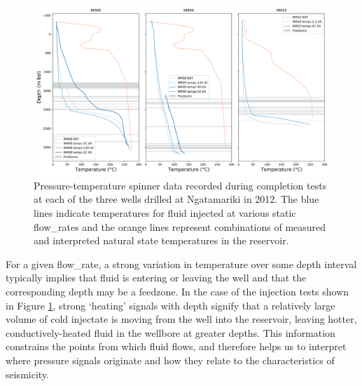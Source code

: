 \begin{figure}
\begin{center}
\includegraphics[width=\textwidth,height=\textheight,keepaspectratio]{Chapter_2_Data/figures/all_wells_Nga/all_wells_Nga_with_feedzones}
\caption[Example \acrfull{PTS} datasets]{{
Pressure-temperature spinner data recorded during completion tests at
each of the three wells drilled at Ngatamariki in 2012. The blue lines
indicate temperatures for fluid injected at various static \glspl{flow_rate}
and the orange lines represent combinations of measured and interpreted
natural state temperatures in the reservoir.
{\label{748181}}%
}}
\end{center}
\end{figure}

For a given \gls{flow_rate}, a strong variation in temperature over some depth interval typically implies that fluid is entering or leaving the well and that the corresponding depth may be a \gls{feedzone}. In the case of the injection tests shown in Figure \ref{748181}, strong `heating' signals with depth signify that a relatively large volume of cold injectate is moving from the well into the reservoir, leaving hotter, conductively-heated fluid in the wellbore at greater depths. This information constrains the points from which fluid flows, and therefore helps us to interpret where pressure signals originate and how they relate to the characteristics of seismicity.

